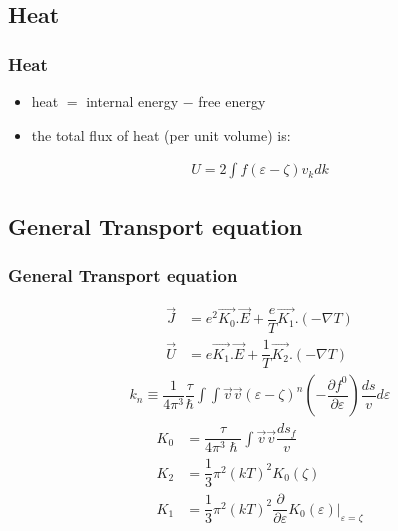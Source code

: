 \documentclass{beamer}
\begin{document}
\subsection{Heat}
\begin{frame}
\frametitle{Heat}
\begin{itemize}
\item heat $=$ internal energy $-$ free energy
\pause
\item the total flux of heat (per unit volume) is:
\end{itemize}
\begin{align*}
U = 2 \int f (\varepsilon - \zeta) v_k dk
\end{align*}
\end{frame}
\subsection{General Transport equation}
\begin{frame}
\frametitle{General Transport equation}
\begin{align*}
\vec{J} &= e^2 \vec{K_0}.\vec{E} +\dfrac{e}{T} \vec{K_1} . (- \nabla T)\\
\vec{U} &= e \vec{K_1}.\vec{E} +\dfrac{1}{T} \vec{K_2} . (- \nabla T)
\end{align*}
\pause
\begin{align*}
k_n \equiv \dfrac{1}{4 \pi ^3} \dfrac{\tau}{\hslash} \int \int \vec{v} \vec{v} (\varepsilon - \zeta)^n (- \dfrac{\partial f^0}{\partial \varepsilon}) \dfrac{ds}{v} d\varepsilon
\end{align*}
\pause
\begin{align*}
K_0 &= \dfrac{\tau}{4\pi^3 \hslash} \int \vec{v}\vec{v} \dfrac{ds_f}{v}\\
K_2 &= \dfrac{1}{3}\pi^2 (kT)^2 K_0 (\zeta)\\
K_1 &= \dfrac{1}{3}\pi^2 (kT)^2 \dfrac{\partial}{\partial \varepsilon} K_0 (\varepsilon) \big| _{\varepsilon = \zeta} 
\end{align*}
\end{frame}
\end{document}
